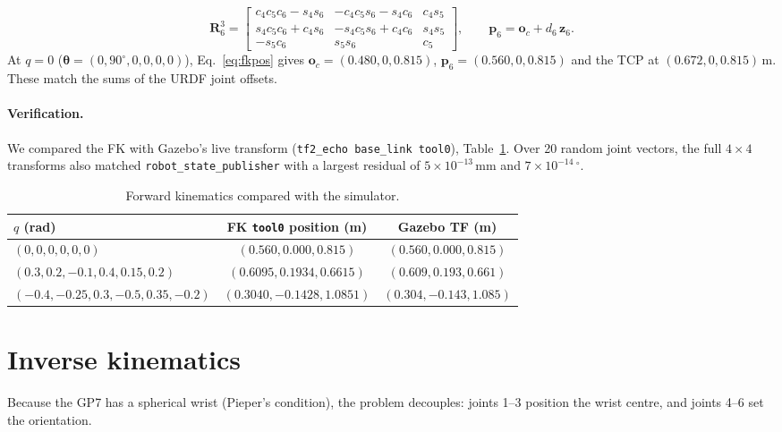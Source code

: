 \documentclass[11pt,a4paper]{article}
\newcommand{\R}[2]{\mathbf{R}^{#1}_{#2}}
\begin{document}
\begin{equation}
\R{3}{6} = \begin{bmatrix}
c_4c_5c_6 - s_4s_6 & -c_4c_5s_6 - s_4c_6 & c_4 s_5\\
s_4c_5c_6 + c_4s_6 & -s_4c_5s_6 + c_4c_6 & s_4 s_5\\
-s_5c_6 & s_5 s_6 & c_5\end{bmatrix},
\qquad
\mathbf p_{6} = \mathbf o_c + d_6\,\mathbf z_6 .
\label{eq:r36}
\end{equation}
At \(q=0\) (\(\boldsymbol\theta = (0,90^\circ,0,0,0,0)\)), Eq.~\eqref{eq:fkpos} gives
\(\mathbf o_c = (0.480, 0, 0.815)\), \(\mathbf p_6 = (0.560, 0, 0.815)\) and the TCP at
\((0.672, 0, 0.815)\)\,m. These match the sums of the URDF joint offsets.

\paragraph{Verification.}
We compared the FK with Gazebo's live transform (\texttt{tf2\_echo base\_link tool0}),
Table~\ref{tab:fkcheck}. Over 20 random joint vectors, the full \(4\times4\) transforms
also matched \texttt{robot\_state\_publisher} with a largest residual of
\(5\times10^{-13}\)\,mm and \(7\times10^{-14}\,^\circ\).
\begin{table}[h]
\centering\small
\begin{tabular}{lcc}
\toprule
\(q\) (rad) & FK \texttt{tool0} position (m) & Gazebo TF (m) \\
\midrule
\((0,0,0,0,0,0)\) & \((0.560, 0.000, 0.815)\) & \((0.560, 0.000, 0.815)\) \\
\((0.3, 0.2, -0.1, 0.4, 0.15, 0.2)\) & \((0.6095, 0.1934, 0.6615)\) & \((0.609, 0.193, 0.661)\) \\
\((-0.4,-0.25,0.3,-0.5,0.35,-0.2)\) & \((0.3040, -0.1428, 1.0851)\) & \((0.304, -0.143, 1.085)\) \\
\bottomrule
\end{tabular}
\caption{Forward kinematics compared with the simulator.}
\label{tab:fkcheck}
\end{table}

\section{Inverse kinematics}

Because the GP7 has a spherical wrist (Pieper's condition), the problem decouples:
joints 1--3 position the wrist centre, and joints 4--6 set the orientation.
\end{document}
